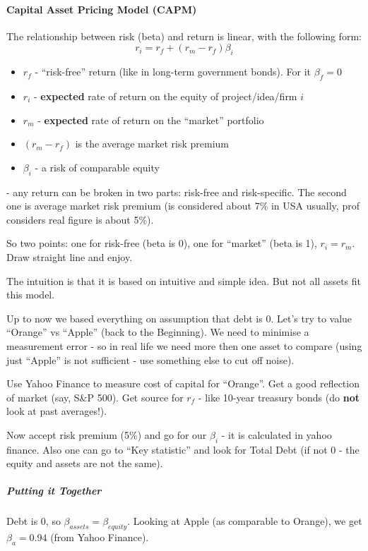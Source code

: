 \documentclass{scrartcl}
\begin{document}

\paragraph{Capital Asset Pricing Model (CAPM)}

The relationship between risk (beta) and return is linear, with the following
form:
$$r_i = r_f + (r_m - r_f)\beta_i$$
\begin{itemize}
\item $r_f$ - ``risk-free'' return (like in long-term government bonds). For it
  $\beta_f = 0$
\item $r_i$ - {\bf expected } rate of return on the equity of project/idea/firm
  $i$
\item $r_m$ - {\bf expected} rate of return on the ``market'' portfolio
\item $(r_m - r_f)$ is the average market risk premium
\item $\beta_i$ - a risk of comparable equity
\end{itemize}
- any return can be broken in two parts: risk-free and risk-specific. The second
one is average market risk premium (is considered about 7\% in USA usually, prof
considers real figure is about 5\%).

So two points: one for risk-free (beta is 0), one for ``market'' (beta is 1),
$r_i = r_m$. Draw straight line and enjoy.

The intuition is that it is based on intuitive and simple idea. But not all
assets fit this model.

Up to now we based everything on assumption that debt is 0. Let's try to value
``Orange'' vs ``Apple'' (back to the Beginning). We need to minimise a
measurement error - so in real life we need more then one asset to compare
(using just ``Apple'' is not sufficient - use something else to cut off noise).

Use Yahoo Finance to measure cost of capital for ``Orange''. Get a good
reflection of market (say, S\&P 500). Get source for $r_f$ - like 10-year
treasury bonds (do {\bf not} look at past averages!).

Now accept risk premium (5\%) and go for our $\beta_i$ - it is calculated in
yahoo finance. Also one can go to ``Key statistic'' and look for Total Debt (if
not 0 - the equity and assets are not the same).  

\subparagraph{Putting it Together}

Debt is 0, so $\beta_{assets} = \beta_{equity}$. Looking at Apple (as comparable
to Orange), we get $\beta_a = 0.94$ (from Yahoo Finance).   
\end{document}
